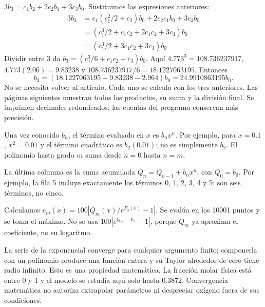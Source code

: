 $3b_3=c_1b_2+2c_2b_1+3c_3b_0$. Sustituimos las expresiones anteriores:
\begin{align*}
3b_3&=c_1(c_1^2/2+c_2)b_0+2c_2c_1b_0+3c_3b_0\\
&=(c_1^3/2+c_1c_2+2c_1c_2+3c_3)b_0\\
&=(c_1^3/2+3c_1c_2+3c_3)b_0.
\end{align*}
Dividir entre 3 da $b_3=(c_1^3/6+c_1c_2+c_3)b_0$. Aquí $4.773^3=108.736237917$, $4.773(2.06)=9.83238$ y $108.736237917/6=18.1227063195$. Entonces
\[
b_3=(18.1227063195+9.83238-2.964)b_0=24.9910863195b_0.
\]
No se necesita volver al artículo. Cada uno se calcula con los tres anteriores. Las páginas siguientes muestran todos los productos, su suma y la división final. Se imprimen decimales redondeados; las cuentas del programa conservan más precisión.



Una vez conocido $b_n$, el término evaluado en $x$ es $b_nx^n$. Por ejemplo, para $x=0.1$, $x^2=0.01$ y el término cuadrático es $b_2(0.01)$; no es simplemente $b_2$. El polinomio hasta grado $m$ suma desde $n=0$ hasta $n=m$.

\begin{center}\scriptsize\end{center}
La última columna es la suma acumulada $Q_n=Q_{n-1}+b_nx^n$, con $Q_0=b_0$. Por ejemplo, la fila 5 incluye exactamente los términos 0, 1, 2, 3, 4 y 5: son seis términos, no cinco.

Calculamos $e_m(x)=100|Q_m(x)/e^{F_3(x)}-1|$. Se evalúa en los 10001 puntos y se toma el máximo. No se usa $100|e^{Q_m-F_3}-1|$, porque $Q_m$ ya aproxima el coeficiente, no su logaritmo.
\begin{center}\end{center}

La serie de la exponencial converge para cualquier argumento finito; componerla con un polinomio produce una función entera y su Taylor alrededor de cero tiene radio infinito. Esto es una propiedad matemática. La fracción molar física está entre 0 y 1 y el modelo se estudia aquí solo hasta 0.3872. Convergencia matemática no autoriza extrapolar parámetros ni despreciar oxígeno fuera de sus condiciones.
